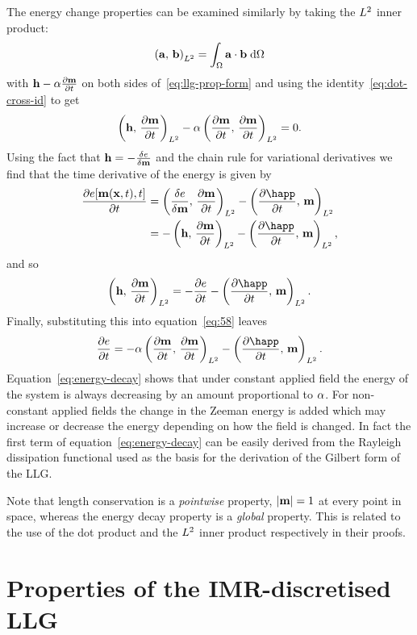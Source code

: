 The energy change properties can be examined similarly by taking the $L^2$ inner product:
\begin{equation}
  \left({\mathbf{a}},\, {\mathbf{b}} \right)_{L^2} = \int_\Omega {\mathbf{a}} \cdot {\mathbf{b}} {\; \text{d}}\Omega
\end{equation}
with $\mathbf{h} - \alpha \frac{\partial \mathbf{m}}{\partial t}$ on both sides of~\eqref{eq:llg-prop-form} and using the identity~\eqref{eq:dot-cross-id} to get
\begin{equation}
  \label{eq:58}
  \left(\mathbf{h},\, \frac{\partial \mathbf{m}}{\partial t} \right)_{L^2} - \alpha \left(\frac{\partial \mathbf{m}}{\partial t},\, \frac{\partial \mathbf{m}}{\partial t} \right)_{L^2} = 0.
\end{equation}
Using the fact that $\mathbf{h} = -\frac{\delta e}{\delta \mathbf{m}}$ and the chain rule for variational derivatives\cite{??ds} we find that the time derivative of the energy is given by
\begin{align*}
  \pd{\e[\mv(\xv, t), t]}{t} &= \ltip{\vd{e}{\mv}}{\dmdt} - \ltip{\pd{\happ}{t}}{\mv} \\
  &= -\ltip{\hv}{\dmdt} - \ltip{\pd{\happ}{t}}{\mv},
\end{align*}
and so
\begin{equation}
  \ltip{\hv}{\dmdt} = -\pd{\e}{t} - \ltip{\pd{\happ}{t}}{\mv}.
\end{equation}
Finally, substituting this into equation~\eqref{eq:58} leaves
\begin{equation}
  \label{eq:energy-decay}
  \pd{\e}{t} = -\dampc \ltip{\dmdt}{\dmdt} - \ltip{\pd{\happ}{t}}{\mv}.
\end{equation}
Equation~\eqref{eq:energy-decay} shows that under constant applied field the energy of the system is always decreasing by an amount proportional to $\alpha$.
For non-constant applied fields the change in the Zeeman energy is added which may increase or decrease the energy depending on how the field is changed. %
In fact the first term of equation~\eqref{eq:energy-decay} can be easily derived from the Rayleigh dissipation functional used as the basis for the derivation of the Gilbert form of the LLG.\cite{Gilbert2004}

Note that length conservation is a \emph{pointwise} property, \ie $\left|{\mathbf{m}} \right| = 1$ at every point in space, whereas the energy decay property is a \emph{global} property.
This is related to the use of the dot product and the $L^2$ inner product respectively in their proofs.


\section{Properties of the IMR-discretised LLG}
\label{sec:prop-imr-llg}

